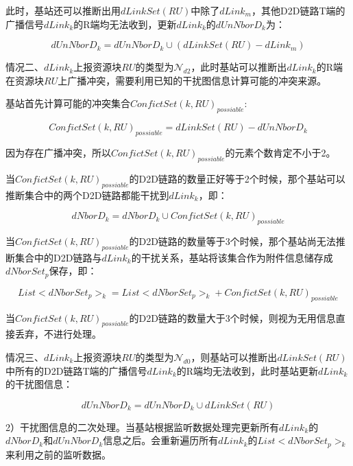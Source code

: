 \documentclass[figurelist,tablelist,algorithmlist,nomlist,masters]{seuthesix}
\begin{document}
	此时，基站还可以推断出用$dLinkSet(RU)$中除了$dLink_m$，其他D2D链路T端的广播信号$dLink_k$的R端均无法收到，更新$dLink_k$的$dUnNborD_k$为：

	\begin{equation}\label{eq2.13}
	dUnNborD_k = dUnNborD_k \cup (dLinkSet(RU) - dLink_m)
	\end{equation}


	情况二、$dLink_k$上报资源块$RU$的类型为$\mathcal{N}_{d2}$，此时基站可以推断出$dLink_k$的R端在资源块$RU$上广播冲突，需要利用已知的干扰图信息计算可能的冲突来源。

	基站首先计算可能的冲突集合$ConfictSet{(k,RU)_{possiable}}$:

	\begin{equation}\label{eq2.14}
	ConfictSet{(k,RU)_{possiable}} = dLinkSet(RU) - dUnNborD_k
	\end{equation}

	因为存在广播冲突，所以$ConfictSet{(k,RU)_{possiable}}$的元素个数肯定不小于2。

	当$ConfictSet{(k,RU)_{possiable}}$的D2D链路的数量正好等于2个时候，那个基站可以推断集合中的两个D2D链路都能干扰到$dLink_k$，即：

	\begin{equation}\label{eq2.15}
	dNborD_k = dNborD_k \cup ConfictSet{(k,RU)_{possiable}}
	\end{equation}

	当$ConfictSet{(k,RU)_{possiable}}$的D2D链路的数量等于3个时候，那个基站尚无法推断集合中的D2D链路与$dLink_k$的干扰关系，基站将该集合作为附件信息储存成$dNborSet_{p}$保存，即：

	\begin{equation}\label{eq2.16}
	List < dNborSet_{p}{ > _k} = List < dNborSet_{p}{ > _k} + ConfictSet{(k,RU)_{possiable}}
	\end{equation}

	当$ConfictSet{(k,RU)_{possiable}}$的D2D链路的数量大于3个时候，则视为无用信息直接丢弃，不进行处理。


	情况三、$dLink_k$上报资源块$RU$的类型为$\mathcal{N}_{d0}$，则基站可以推断出$dLinkSet(RU)$中所有的D2D链路T端的广播信号$dLink_k$的R端均无法收到，此时基站更新$dLink_k$的干扰图信息：

	\begin{equation}\label{eq2.17}
	dUnNborD_k = dUnNborD_k \cup dLinkSet(RU)
	\end{equation}

	2）干扰图信息的二次处理。当基站根据监听数据处理完更新所有$dLink_k$的$dNborD_k$和$dUnNborD_k$信息之后。会重新遍历所有$dLink_k$的$List < dNborSet_{p}{ > _k}$来利用之前的监听数据。
\end{document}
